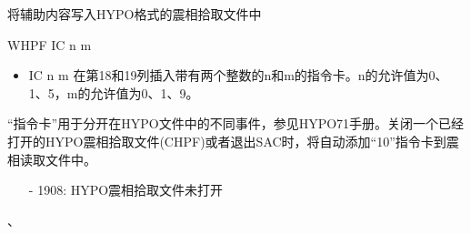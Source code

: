 \label{cmd:whpf}

将辅助内容写入HYPO格式的震相拾取文件中

\begin{SACSTX}
WHPF IC n m
\end{SACSTX}

\begin{itemize}
\item IC n m  在第18和19列插入带有两个整数的n和m的指令卡。n的允许值为0、1、5，m的允许值为0、1、9。
\end{itemize}

``指令卡''用于分开在HYPO文件中的不同事件，参见HYPO71手册。关闭一个已经打开的HYPO震相拾取文件(CHPF)或者退出SAC时，将自动添加``10''指令卡到震相读取文件中。

\begin{itemize}
\item[-]1908: HYPO震相拾取文件未打开
\end{itemize}

、
